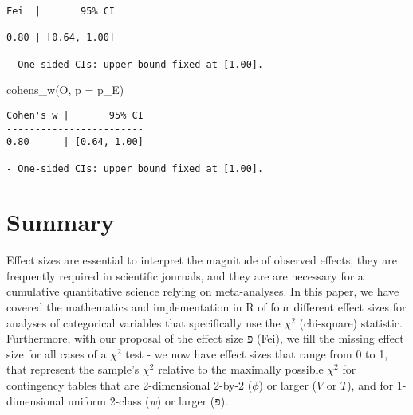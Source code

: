 \documentclass[mathematics,article,submit,moreauthors,pdftex]{mdpi}
\newenvironment{Shaded}{\begin{snugshade}}{\end{snugshade}}
\newcommand{\AttributeTok}[1]{\textcolor[rgb]{0.77,0.63,0.00}{#1}}
\newcommand{\FunctionTok}[1]{\textcolor[rgb]{0.00,0.00,0.00}{#1}}
\newcommand{\NormalTok}[1]{#1}
\begin{document}
\begin{verbatim}
Fei  |       95% CI
-------------------
0.80 | [0.64, 1.00]

- One-sided CIs: upper bound fixed at [1.00].
\end{verbatim}

\begin{Shaded}
\begin{Highlighting}[]
\FunctionTok{cohens\_w}\NormalTok{(O, }\AttributeTok{p =}\NormalTok{ p\_E)}
\end{Highlighting}
\end{Shaded}

\begin{verbatim}
Cohen's w |       95% CI
------------------------
0.80      | [0.64, 1.00]

- One-sided CIs: upper bound fixed at [1.00].
\end{verbatim}

\hypertarget{summary}{%
\section{Summary}\label{summary}}

Effect sizes are essential to interpret the magnitude of observed
effects, they are frequently required in scientific journals, and they
are are necessary for a cumulative quantitative science relying on
meta-analyses. In this paper, we have covered the mathematics and
implementation in R of four different effect sizes for analyses of
categorical variables that specifically use the \(\chi^2\) (chi-square)
statistic. Furthermore, with our proposal of the effect size פ (Fei), we
fill the missing effect size for all cases of a \(\chi^2\) test - we now
have effect sizes that range from 0 to 1, that represent the sample's
\(\chi^2\) relative to the maximally possible \(\chi^2\) for contingency
tables that are 2-dimensional 2-by-2 (\(\phi\)) or larger (\(V\) or
\(T\)), and for 1-dimensional uniform 2-class (\emph{w}) or larger (פ).

%
\end{document}
